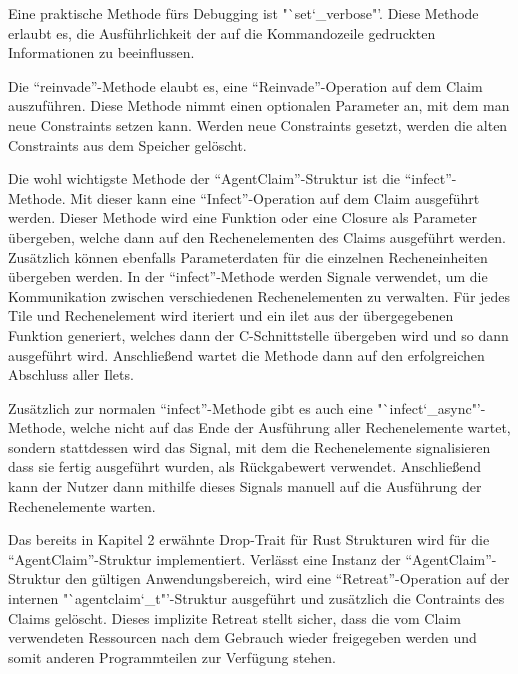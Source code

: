 Eine praktische Methode fürs Debugging ist "`set\char`_verbose"'. Diese Methode erlaubt es, die Ausführlichkeit der auf
die Kommandozeile gedruckten Informationen zu beeinflussen.

Die "`reinvade"'-Methode elaubt es, eine "`Reinvade"'-Operation auf dem Claim auszuführen. Diese Methode nimmt einen
optionalen Parameter an, mit dem man neue Constraints setzen kann. Werden neue Constraints gesetzt, werden die alten Constraints
aus dem Speicher gelöscht. 

Die wohl wichtigste Methode der "`AgentClaim"'-Struktur ist die "`infect"'-Methode. Mit dieser kann eine "`Infect"'-Operation
auf dem Claim ausgeführt werden. Dieser Methode wird eine Funktion oder eine Closure als Parameter übergeben, welche dann auf den
Rechenelementen des Claims ausgeführt werden. Zusätzlich können ebenfalls Parameterdaten für die einzelnen Recheneinheiten
übergeben werden.
In der "`infect"'-Methode werden Signale verwendet, um die Kommunikation zwischen verschiedenen Rechenelementen zu verwalten.
Für jedes Tile und Rechenelement wird iteriert und ein ilet aus der übergegebenen Funktion generiert, welches dann der C-Schnittstelle 
übergeben wird und so dann ausgeführt wird. Anschließend wartet die Methode dann auf den erfolgreichen Abschluss aller Ilets.

Zusätzlich zur normalen "`infect"'-Methode gibt es auch eine "`infect\char`_async"'-Methode, welche nicht auf das Ende der
Ausführung aller Rechenelemente wartet, sondern stattdessen wird das Signal, mit dem die Rechenelemente signalisieren dass sie fertig
ausgeführt wurden, als Rückgabewert verwendet. Anschließend kann der Nutzer dann mithilfe dieses Signals manuell auf die
Ausführung der Rechenelemente warten.

Das bereits in Kapitel 2 erwähnte Drop-Trait für Rust Strukturen wird für die "`AgentClaim"'-Struktur implementiert.
Verlässt eine Instanz der "`AgentClaim"'-Struktur den gültigen Anwendungsbereich, wird eine "`Retreat"'-Operation auf der
internen "`agentclaim\char`_t"'-Struktur ausgeführt und zusätzlich die Contraints des Claims gelöscht. Dieses implizite Retreat
stellt sicher, dass die vom Claim verwendeten Ressourcen nach dem Gebrauch wieder freigegeben werden und somit anderen
Programmteilen zur Verfügung stehen.
